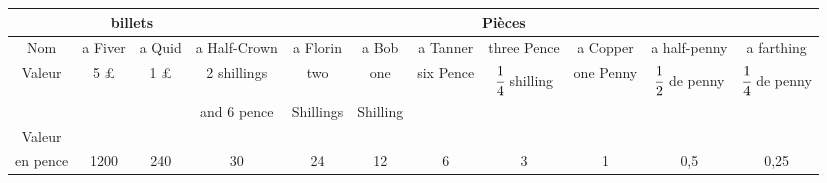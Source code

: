 \documentclass[12pt,french]{article}
\begin{document}
\footnotesize
\begin{center}
\begin{tabular}{|c|c|c|c|c|c|c|c|c|c|c|}
	\hline
	&\multicolumn{2}{c}{billets}&\multicolumn{8}{|c|}{Pièces}\\
	\hline
	Nom&a Fiver&a Quid&a Half-Crown&a Florin&a Bob&a Tanner&three Pence&a Copper&a half-penny&a farthing\\
	\hline
Valeur&5 \pounds&1 \pounds&2 shillings &two &one&six Pence&$\cfrac 1 4$ shilling&one Penny&$\cfrac 1 2$ de penny&$\cfrac 1 4$ de penny\\
&&& and 6 pence&Shillings& Shilling&&&&&\\
\hline
Valeur&&&&&&&&&&\\
 en pence&1200&240&30&24&12&6&3&1&0,5&0,25\\
\hline
\end{tabular}
\end{center}
\normalsize
\end{document}
